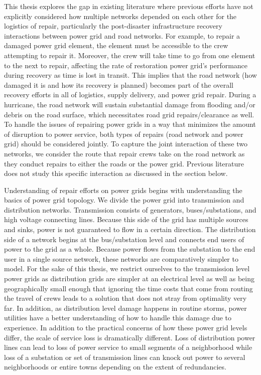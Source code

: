 \documentclass{article}
\begin{document}
	This thesis explores the gap in existing literature where previous efforts have not explicitly considered how multiple networks depended on each other for the logistics of repair, particularly the post-disaster infrastructure recovery interactions between power grid and road networks. For example, to repair a damaged power grid element, the element must be accessible to the crew attempting to repair it. Moreover, the crew will take time to go from one element to the next to repair, affecting the rate of restoration power grid's performance during recovery as time is lost in transit. This implies that the road network (how damaged it is and how its recovery is planned) becomes part of the overall recovery efforts in all of logistics, supply delivery, and power grid repair. During a hurricane, the road network will sustain substantial damage from flooding and/or debris on the road surface, which necessitates road grid repairs/clearance as well. To handle the issues of repairing power grids in a way that minimizes the amount of disruption to power service, both types of repairs (road network and power grid) should be considered jointly. To capture the joint interaction of these two networks, we consider the route that repair crews take on the road network as they conduct repairs to either the roads or the power grid. Previous literature does not study this specific interaction as discussed in the section below.

	Understanding of repair efforts on power grids begins with understanding the basics of power grid topology. We divide the power grid into transmission and distribution networks. Transmission consists of generators, buses/substations, and high voltage connecting lines. Because this side of the grid has multiple sources and sinks, power is not guaranteed to flow in a certain direction. The distribution side of a network begins at the bus/substation level and connects end users of power to the grid as a whole. Because power flows from the substation to the end user in a single source network, these networks are comparatively simpler to model. For the sake of this thesis, we restrict ourselves to the transmission level power grids as distribution grids are simpler at an electrical level as well as being geographically small enough that ignoring the time costs that come from routing the travel of crews leads to a solution that does not stray from optimality very far. In addition, as distribution level damage happens in routine storms, power utilities have a better understanding of how to handle this damage due to experience. In addition to the practical concerns of how these power grid levels differ, the scale of service loss is dramatically different. Loss of distribution power lines can lead to loss of power service to small segments of a neighborhood while loss of a substation or set of transmission lines can knock out power to several neighborhoods or entire towns depending on the extent of redundancies.
	
\end{document}
